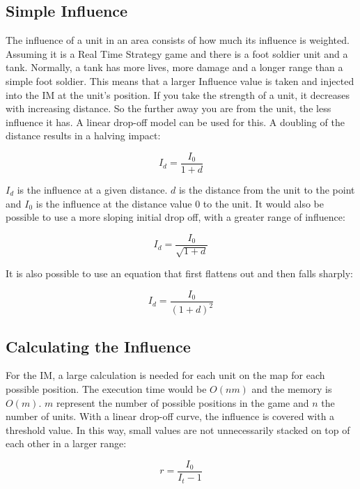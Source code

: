 \documentclass[]{report}
\begin{document}
	
	\subsection{Simple Influence} \label{ssec:num2}
	The influence of a unit in an area consists of how much its influence is weighted. Assuming it is a Real Time Strategy game and there is a foot soldier unit and a tank. Normally, a tank has more lives, more damage and a longer range than a simple foot soldier. This means that a larger Influence value is taken and injected into the \ac{IM} at the unit's position. If you take the strength of a unit, it decreases with increasing distance. So the further away you are from the unit, the less influence it has. A linear drop-off model can be used for this. A doubling of the distance results in a halving impact:
	
	\begin{equation}
		I_{d} = \frac{I_{0}}{1 + d}
	\end{equation}

	
	$I_{d}$ is the influence at a given distance. $d$ is the distance from the unit to the point and $I_{0}$ is the influence at the distance value 0 to the unit. It would also be possible to use a more sloping initial drop off, with a greater range of influence:
	
	\begin{equation}
		I_{d} = \frac{I_{0}}{\sqrt{1 + d}}
	\end{equation}
	
	It is also possible to use an equation that first flattens out and then falls sharply: 
	
	\begin{equation}
		I_{d} = \frac{I_{0}}{(1 + d)^2}
	\end{equation}
	
	\subsection{Calculating the Influence}
	For the \ac{IM}, a large calculation is needed for each unit on the map for each possible position. The execution time would be $O(nm)$ and the memory is $O(m)$. $m$ represent the number of possible positions in the game and $n$ the number of units. With a linear drop-off curve, the influence is covered with a threshold value. In this way, small values are not unnecessarily stacked on top of each other in a larger range:
	
	\begin{equation}
		r = \frac{I_0}{I_t - 1}
	\end{equation}
\end{document}
